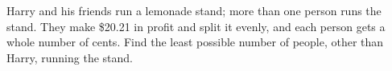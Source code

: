 Harry and his friends run a lemonade stand; more than one person runs the stand. They make \$20.21 in profit and split it evenly, and each person gets a whole number of cents. Find the least possible number of people, other than Harry, running the stand.
